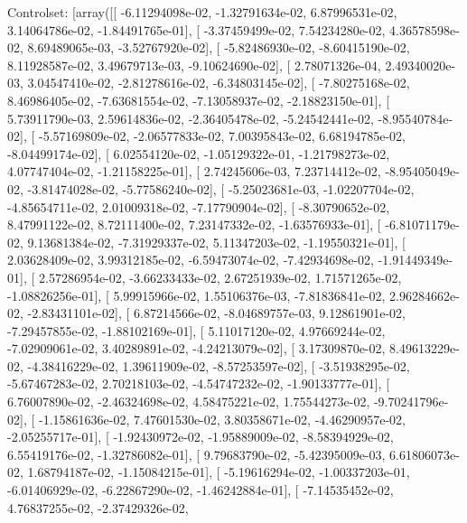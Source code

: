 \documentclass{article}
\begin{document}
Controlset: [array([[ -6.11294098e-02,  -1.32791634e-02,   6.87996531e-02,
          3.14064786e-02,  -1.84491765e-01],
       [ -3.37459499e-02,   7.54234280e-02,   4.36578598e-02,
          8.69489065e-03,  -3.52767920e-02],
       [ -5.82486930e-02,  -8.60415190e-02,   8.11928587e-02,
          3.49679713e-03,  -9.10624690e-02],
       [  2.78071326e-04,   2.49340020e-03,   3.04547410e-02,
         -2.81278616e-02,  -6.34803145e-02],
       [ -7.80275168e-02,   8.46986405e-02,  -7.63681554e-02,
         -7.13058937e-02,  -2.18823150e-01],
       [  5.73911790e-03,   2.59614836e-02,  -2.36405478e-02,
         -5.24542441e-02,  -8.95540784e-02],
       [ -5.57169809e-02,  -2.06577833e-02,   7.00395843e-02,
          6.68194785e-02,  -8.04499174e-02],
       [  6.02554120e-02,  -1.05129322e-01,  -1.21798273e-02,
          4.07747404e-02,  -1.21158225e-01],
       [  2.74245606e-03,   7.23714412e-02,  -8.95405049e-02,
         -3.81474028e-02,  -5.77586240e-02],
       [ -5.25023681e-03,  -1.02207704e-02,  -4.85654711e-02,
          2.01009318e-02,  -7.17790904e-02],
       [ -8.30790652e-02,   8.47991122e-02,   8.72111400e-02,
          7.23147332e-02,  -1.63576933e-01],
       [ -6.81071179e-02,   9.13681384e-02,  -7.31929337e-02,
          5.11347203e-02,  -1.19550321e-01],
       [  2.03628409e-02,   3.99312185e-02,  -6.59473074e-02,
         -7.42934698e-02,  -1.91449349e-01],
       [  2.57286954e-02,  -3.66233433e-02,   2.67251939e-02,
          1.71571265e-02,  -1.08826256e-01],
       [  5.99915966e-02,   1.55106376e-03,  -7.81836841e-02,
          2.96284662e-02,  -2.83431101e-02],
       [  6.87214566e-02,  -8.04689757e-03,   9.12861901e-02,
         -7.29457855e-02,  -1.88102169e-01],
       [  5.11017120e-02,   4.97669244e-02,  -7.02909061e-02,
          3.40289891e-02,  -4.24213079e-02],
       [  3.17309870e-02,   8.49613229e-02,  -4.38416229e-02,
          1.39611909e-02,  -8.57253597e-02],
       [ -3.51938295e-02,  -5.67467283e-02,   2.70218103e-02,
         -4.54747232e-02,  -1.90133777e-01],
       [  6.76007890e-02,  -2.46324698e-02,   4.58475221e-02,
          1.75544273e-02,  -9.70241796e-02],
       [ -1.15861636e-02,   7.47601530e-02,   3.80358671e-02,
         -4.46290957e-02,  -2.05255717e-01],
       [ -1.92430972e-02,  -1.95889009e-02,  -8.58394929e-02,
          6.55419176e-02,  -1.32786082e-01],
       [  9.79683790e-02,  -5.42395009e-03,   6.61806073e-02,
          1.68794187e-02,  -1.15084215e-01],
       [ -5.19616294e-02,  -1.00337203e-01,  -6.01406929e-02,
         -6.22867290e-02,  -1.46242884e-01],
       [ -7.14535452e-02,   4.76837255e-02,  -2.37429326e-02,
\end{document}
